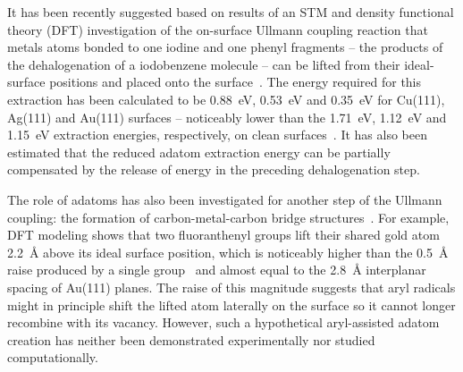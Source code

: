\documentclass[aps,prb,amsmath,amssymb,11pt]{revtex4-1}
\begin{document}
It has been recently suggested based on results of an STM and density functional theory (DFT) investigation of the on-surface Ullmann coupling reaction that metals atoms bonded to one iodine and one phenyl fragments -- the products of the dehalogenation of a iodobenzene molecule -- can be lifted from their ideal-surface positions and placed onto the surface~\cite{chemeurope2017}. 
The energy required for this extraction has been calculated to be \SI{0.88}{\electronvolt}, \SI{0.53}{\electronvolt} and \SI{0.35}{\electronvolt} for Cu(111), Ag(111) and Au(111) surfaces -- noticeably lower than the \SI{1.71}{\electronvolt}, \SI{1.12}{\electronvolt} and \SI{1.15}{\electronvolt} extraction energies, respectively, on clean surfaces~\cite{chemeurope2017}. %
%
It has also been estimated that the reduced adatom extraction energy can be partially compensated by the release of energy in the preceding dehalogenation step. %

The role of adatoms has also been investigated for another step of the Ullmann coupling: the formation of carbon-metal-carbon bridge structures~\cite{acsnano2017, jpcc2018, acsnano2019}. 
For example, DFT modeling shows that two fluoranthenyl groups lift their shared gold atom \SI{2.2}{\angstrom} above its ideal surface position, which is noticeably higher than the \SI{0.5}{\angstrom} raise produced by a single group~\cite{jpcc2018} and almost equal to the 
\SI{2.8}{\angstrom} interplanar spacing of Au(111) planes.
The raise of this magnitude suggests that aryl radicals might in principle shift the lifted atom laterally on the surface so it cannot longer recombine with its vacancy. However, such a hypothetical aryl-assisted adatom creation has neither been demonstrated experimentally nor studied computationally.
\end{document}
